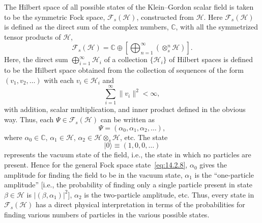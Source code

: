 The Hilbert space of all possible states of the Klein--Gordon scalar field is taken to
be the symmetric Fock space, \(\mathcal F_s(\mathcal H)\), constructed from
\(\mathcal H\). Here \(\mathcal F_s(\mathcal H)\) is defined as the direct sum of
the complex numbers, \(\mathbb C\), with all the symmetrized tensor products of
\(\mathcal H\),
\begin{equation}
  \mathcal F_s(\mathcal H)
  =\mathbb C\oplus\left[\bigoplus_{n=1}^{\infty}
    (\otimes_s^n\mathcal H)\right].
  \tag{14.2.7}\label{eq:14.2.7}
\end{equation}
Here, the direct sum \(\bigoplus_{i=1}^{\infty}\mathcal H_i\) of a collection
\(\{\mathcal H_i\}\) of Hilbert spaces is defined to be the Hilbert space obtained
from the collection of sequences of the form \((v_1,v_2,\ldots)\) with each
\(v_i\in\mathcal H_i\) and
\[
  \sum_{i=1}^{\infty}\lVert v_i\rVert^2<\infty,
\]
with addition, scalar multiplication, and inner product defined in the obvious way.
Thus, each \(\Psi\in\mathcal F_s(\mathcal H)\) can be written as
\begin{equation}
  \Psi=(\alpha_0,\alpha_1,\alpha_2,\ldots),
  \tag{14.2.8}\label{eq:14.2.8}
\end{equation}
where \(\alpha_0\in\mathbb C\), \(\alpha_1\in\mathcal H\),
\(\alpha_2\in\mathcal H\otimes_s\mathcal H\), etc. The state
\begin{equation}
  \lvert0\rangle\equiv(1,0,0,\ldots)
  \tag{14.2.9}\label{eq:14.2.9}
\end{equation}
represents the vacuum state of the field, i.e., the state in which no particles are
present. Hence for the general Fock space state~\eqref{eq:14.2.8}, \(\alpha_0\)
gives the amplitude for finding the field to be in the vacuum state, \(\alpha_1\) is the
``one-particle amplitude'' [i.e., the probability of finding only a single particle
present in state \(\beta\in\mathcal H\) is \(\lvert(\beta,\alpha_1)\rvert^2\)],
\(\alpha_2\) is the two-particle amplitude, etc. Thus, every state in
\(\mathcal F_s(\mathcal H)\) has a direct physical interpretation in terms of the
probabilities for finding various numbers of particles in the various possible states.

